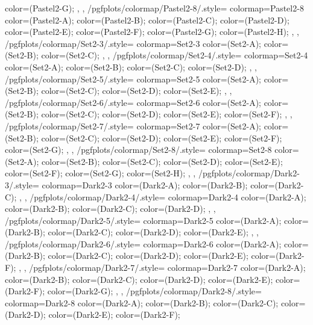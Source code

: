{{{      color=(Pastel2-G);
    },
  },
  /pgfplots/colormap/Pastel2-8/.style={
    colormap={Pastel2-8}{
      color=(Pastel2-A);
      color=(Pastel2-B);
      color=(Pastel2-C);
      color=(Pastel2-D);
      color=(Pastel2-E);
      color=(Pastel2-F);
      color=(Pastel2-G);
      color=(Pastel2-H);
    },
  },
  /pgfplots/colormap/Set2-3/.style={
    colormap={Set2-3}{
      color=(Set2-A);
      color=(Set2-B);
      color=(Set2-C);
    },
  },
  /pgfplots/colormap/Set2-4/.style={
    colormap={Set2-4}{
      color=(Set2-A);
      color=(Set2-B);
      color=(Set2-C);
      color=(Set2-D);
    },
  },
  /pgfplots/colormap/Set2-5/.style={
    colormap={Set2-5}{
      color=(Set2-A);
      color=(Set2-B);
      color=(Set2-C);
      color=(Set2-D);
      color=(Set2-E);
    },
  },
  /pgfplots/colormap/Set2-6/.style={
    colormap={Set2-6}{
      color=(Set2-A);
      color=(Set2-B);
      color=(Set2-C);
      color=(Set2-D);
      color=(Set2-E);
      color=(Set2-F);
    },
  },
  /pgfplots/colormap/Set2-7/.style={
    colormap={Set2-7}{
      color=(Set2-A);
      color=(Set2-B);
      color=(Set2-C);
      color=(Set2-D);
      color=(Set2-E);
      color=(Set2-F);
      color=(Set2-G);
    },
  },
  /pgfplots/colormap/Set2-8/.style={
    colormap={Set2-8}{
      color=(Set2-A);
      color=(Set2-B);
      color=(Set2-C);
      color=(Set2-D);
      color=(Set2-E);
      color=(Set2-F);
      color=(Set2-G);
      color=(Set2-H);
    },
  },
  /pgfplots/colormap/Dark2-3/.style={
    colormap={Dark2-3}{
      color=(Dark2-A);
      color=(Dark2-B);
      color=(Dark2-C);
    },
  },
  /pgfplots/colormap/Dark2-4/.style={
    colormap={Dark2-4}{
      color=(Dark2-A);
      color=(Dark2-B);
      color=(Dark2-C);
      color=(Dark2-D);
    },
  },
  /pgfplots/colormap/Dark2-5/.style={
    colormap={Dark2-5}{
      color=(Dark2-A);
      color=(Dark2-B);
      color=(Dark2-C);
      color=(Dark2-D);
      color=(Dark2-E);
    },
  },
  /pgfplots/colormap/Dark2-6/.style={
    colormap={Dark2-6}{
      color=(Dark2-A);
      color=(Dark2-B);
      color=(Dark2-C);
      color=(Dark2-D);
      color=(Dark2-E);
      color=(Dark2-F);
    },
  },
  /pgfplots/colormap/Dark2-7/.style={
    colormap={Dark2-7}{
      color=(Dark2-A);
      color=(Dark2-B);
      color=(Dark2-C);
      color=(Dark2-D);
      color=(Dark2-E);
      color=(Dark2-F);
      color=(Dark2-G);
    },
  },
  /pgfplots/colormap/Dark2-8/.style={
    colormap={Dark2-8}{
      color=(Dark2-A);
      color=(Dark2-B);
      color=(Dark2-C);
      color=(Dark2-D);
      color=(Dark2-E);
      color=(Dark2-F);
}}}
